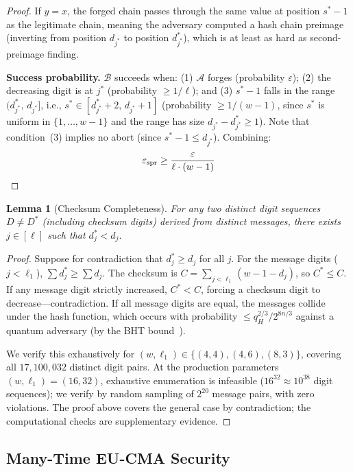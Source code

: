 \documentclass[11pt]{article}
\newtheorem{lemma}[theorem]{Lemma}
\begin{document}
\begin{proof}
If $y = x$, the forged chain passes through the same value at position
$s^* - 1$ as the legitimate chain, meaning the adversary computed a
hash chain preimage (inverting from position $d_{j^*}$ to position
$d^*_{j^*}$), which is at least as hard as second-preimage finding.

\textbf{Success probability.}
$\mathcal{B}$ succeeds when: (1) $\mathcal{A}$ forges
(probability $\varepsilon$); (2) the decreasing digit is at $j^*$
(probability $\geq 1/\ell$); and (3) $s^* - 1$ falls in the range
$(d^*_{j^*},\, d_{j^*}]$, i.e., $s^* \in [d^*_{j^*} + 2,\,
d_{j^*} + 1]$ (probability $\geq 1/(w-1)$, since $s^*$ is uniform in
$\{1, \ldots, w-1\}$ and the range has size
$d_{j^*} - d^*_{j^*} \geq 1$). Note that condition~(3) implies
no abort (since $s^* - 1 \leq d_{j^*}$). Combining:
\[
\varepsilon_{\mathrm{spr}} \geq
\frac{\varepsilon}{\ell \cdot (w-1)} \qedhere
\]
\end{proof}

\begin{lemma}[Checksum Completeness]\label{lem:checksum}
For any two distinct digit sequences $D \neq D^*$ (including checksum
digits) derived from distinct messages, there exists $j \in [\ell]$
such that $d^*_j < d_j$.
\end{lemma}

\begin{proof}
Suppose for contradiction that $d^*_j \geq d_j$ for all $j$. For the
message digits ($j < \ell_1$), $\sum d^*_j \geq \sum d_j$. The
checksum is $C = \sum_{j < \ell_1} (w - 1 - d_j)$, so $C^* \leq C$.
If any message digit strictly increased, $C^* < C$, forcing a checksum
digit to decrease---contradiction. If all message digits are equal, the
messages collide under the hash function, which occurs with probability
$\leq q_H^{2/3} / 2^{8n/3}$ against a quantum adversary (by the BHT
bound~\cite{bht}).

We verify this exhaustively for $(w, \ell_1) \in \{(4, 4), (4, 6),
(8, 3)\}$, covering all $17{,}100{,}032$ distinct digit pairs.
At the production parameters $(w, \ell_1) = (16, 32)$, exhaustive
enumeration is infeasible ($16^{32} \approx 10^{38}$ digit sequences);
we verify by random sampling of $2^{20}$ message pairs, with zero
violations. The proof above covers the general case by contradiction;
the computational checks are supplementary evidence.
\end{proof}

\subsection{Many-Time EU-CMA Security}
\end{document}
